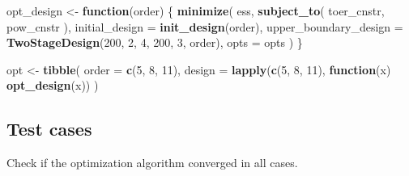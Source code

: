 \documentclass[]{book}
\newenvironment{Shaded}{\begin{snugshade}}{\end{snugshade}}
\newcommand{\ControlFlowTok}[1]{\textcolor[rgb]{0.13,0.29,0.53}{\textbf{#1}}}
\newcommand{\DataTypeTok}[1]{\textcolor[rgb]{0.13,0.29,0.53}{#1}}
\newcommand{\DecValTok}[1]{\textcolor[rgb]{0.00,0.00,0.81}{#1}}
\newcommand{\KeywordTok}[1]{\textcolor[rgb]{0.13,0.29,0.53}{\textbf{#1}}}
\newcommand{\NormalTok}[1]{#1}
\newcommand{\OperatorTok}[1]{\textcolor[rgb]{0.81,0.36,0.00}{\textbf{#1}}}
\newcommand{\StringTok}[1]{\textcolor[rgb]{0.31,0.60,0.02}{#1}}
\begin{document}
\begin{Shaded}
\begin{Highlighting}[]
\NormalTok{opt_design <-}\StringTok{ }\ControlFlowTok{function}\NormalTok{(order) \{}
    \KeywordTok{minimize}\NormalTok{(}
\NormalTok{        ess,}
        \KeywordTok{subject_to}\NormalTok{(}
\NormalTok{            toer_cnstr,}
\NormalTok{            pow_cnstr}
\NormalTok{        ),}
        \DataTypeTok{initial_design =} \KeywordTok{init_design}\NormalTok{(order),}
        \DataTypeTok{upper_boundary_design =} \KeywordTok{TwoStageDesign}\NormalTok{(}\DecValTok{200}\NormalTok{, }\DecValTok{2}\NormalTok{, }\DecValTok{4}\NormalTok{, }\DecValTok{200}\NormalTok{, }\DecValTok{3}\NormalTok{, order),}
        \DataTypeTok{opts =}\NormalTok{ opts}
\NormalTok{    )}
\NormalTok{\}}

\NormalTok{opt <-}\StringTok{ }\KeywordTok{tibble}\NormalTok{(}
  \DataTypeTok{order  =} \KeywordTok{c}\NormalTok{(}\DecValTok{5}\NormalTok{, }\DecValTok{8}\NormalTok{, }\DecValTok{11}\NormalTok{),}
  \DataTypeTok{design =} \KeywordTok{lapply}\NormalTok{(}\KeywordTok{c}\NormalTok{(}\DecValTok{5}\NormalTok{, }\DecValTok{8}\NormalTok{, }\DecValTok{11}\NormalTok{), }\ControlFlowTok{function}\NormalTok{(x) }\KeywordTok{opt_design}\NormalTok{(x))}
\NormalTok{)}
\end{Highlighting}
\end{Shaded}

\hypertarget{test-cases-10}{%
\subsection{Test cases}\label{test-cases-10}}

Check if the optimization algorithm converged in all cases.

\begin{Shaded}
\end{Shaded}
\end{document}
